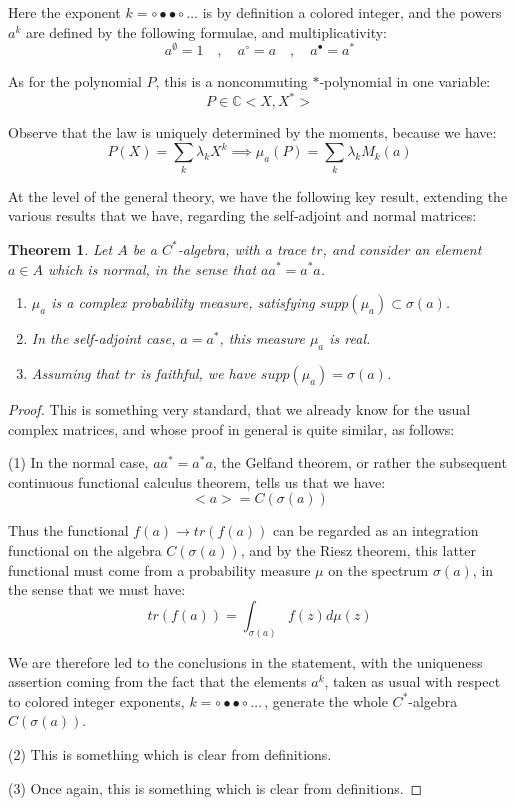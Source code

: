 \documentclass[12pt]{amsbook}
\newtheorem{theorem}{Theorem}[chapter]
\begin{document}
Here the exponent $k=\circ\bullet\bullet\circ\ldots$ is by definition a colored integer, and the powers $a^k$ are defined by the following formulae, and multiplicativity: 
$$a^\emptyset=1\quad,\quad
a^\circ=a\quad,\quad
a^\bullet=a^*$$ 

As for the polynomial $P$, this is a noncommuting $*$-polynomial in one variable: 
$$P\in\mathbb C<X,X^*>$$

Observe that the law is uniquely determined by the moments, because we have:
$$P(X)=\sum_k\lambda_kX^k
\implies\mu_a(P)=\sum_k\lambda_kM_k(a)$$

At the level of the general theory, we have the following key result, extending the various results that we have, regarding the self-adjoint and normal matrices:


\begin{theorem}
Let $A$ be a $C^*$-algebra, with a trace $tr$, and consider an element $a\in A$ which is normal, in the sense that $aa^*=a^*a$.
\begin{enumerate}
\item $\mu_a$ is a complex probability measure, satisfying $supp(\mu_a)\subset\sigma(a)$.

\item In the self-adjoint case, $a=a^*$, this measure $\mu_a$ is real.

\item Assuming that $tr$ is faithful, we have $supp(\mu_a)=\sigma(a)$.
\end{enumerate}
\end{theorem}

\begin{proof}
This is something very standard, that we already know for the usual complex matrices, and whose proof in general is quite similar, as follows:

\medskip

(1) In the normal case, $aa^*=a^*a$, the Gelfand theorem, or rather the subsequent continuous functional calculus theorem, tells us that we have: 
$$<a>=C(\sigma(a))$$

Thus the functional $f(a)\to tr(f(a))$ can be regarded as an integration functional on the algebra $C(\sigma(a))$, and by the Riesz theorem, this latter functional must come from a probability measure $\mu$ on the spectrum $\sigma(a)$, in the sense that we must have:
$$tr(f(a))=\int_{\sigma(a)}f(z)d\mu(z)$$

We are therefore led to the conclusions in the statement, with the uniqueness assertion coming from the fact that the elements $a^k$, taken as usual with respect to colored integer exponents, $k=\circ\bullet\bullet\circ\ldots$\,, generate the whole $C^*$-algebra $C(\sigma(a))$.

\medskip

(2) This is something which is clear from definitions.

\medskip

(3) Once again, this is something which is clear from definitions.
\end{proof}
\end{document}
